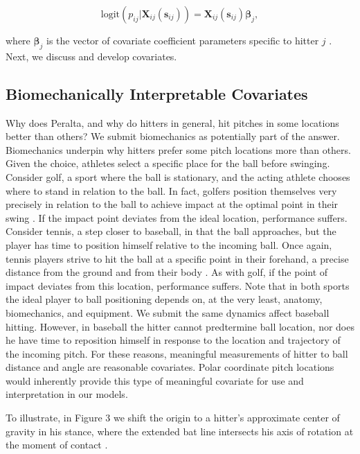 \begin{equation}
\text{logit}(p_{ij}|\pmb{X}_{ij}(\pmb{s}_{ij})) = \pmb{X}_{ij}(\pmb{s}_{ij}) \pmb{\beta}_{j},
\end{equation}

where $\pmb{\beta}_{j}$ is the vector of covariate coefficient parameters specific to hitter $j$ \citep{Myers2012}. Next, we discuss and develop covariates.

\subsection{Biomechanically Interpretable Covariates} %

Why does Peralta, and why do hitters in general, hit pitches in some locations better than others? We submit biomechanics as potentially part of the answer. Biomechanics underpin why hitters prefer some pitch locations more than others. Given the choice, athletes select a specific place for the ball before swinging. Consider golf, a sport where the ball is stationary, and the acting athlete chooses where to stand in relation to the ball. In fact, golfers position themselves very precisely in relation to the ball to achieve impact at the optimal point in their swing \citep{Cochran2005}. If the impact point deviates from the ideal location, performance suffers. Consider tennis, a step closer to baseball, in that the ball approaches, but the player has time to position himself relative to the incoming ball. Once again, tennis players strive to hit the ball at a specific point in their forehand, a precise distance from the ground and from their body \citep{Elliott2006}. As with golf, if the point of impact deviates from this location, performance suffers. Note that in both sports the ideal player to ball positioning depends on, at the very least, anatomy, biomechanics, and equipment. We submit the same dynamics affect baseball hitting. However, in baseball the hitter cannot predtermine ball location, nor does he have time to reposition himself in response to the location and trajectory of the incoming pitch. For these reasons, meaningful measurements of hitter to ball distance and angle are reasonable covariates. Polar coordinate pitch locations would inherently provide this type of meaningful covariate for use and interpretation in our models.

To illustrate, in Figure 3 we shift the origin to a hitter's approximate center of gravity in his stance, where the extended bat line intersects his axis of rotation at the moment of contact \citep{Welch1995}.

